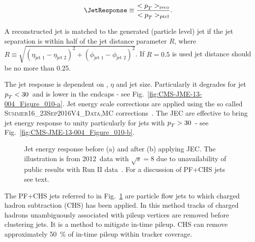\begin{description}
\begin{equation}
\JetResponse\equiv\frac{<\pt>_{\text{reco}}}{<\pt>_{\text{ptcl}}}.    
\end{equation}

A reconstructed jet is matched to the generated (particle level) jet if the jet separation is within half of the jet distance parameter $R$, where $R\equiv\sqrt{\left(\eta_{\text{jet\ 1}} - \eta_{\text{jet\ 2}} \right)^{2}+\left(\phi_{\text{jet\ 1}} - \phi_{\text{jet\ 2}}\right)^{2}}$. If $R=0.5$ is used jet distance should be no more than 0.25.

The jet response is dependent on \pt, $\eta$ and jet size. Particularly it degrades for jet $p_{T}^{}<30$~\GeV and is lower in the endcaps - see Fig.~\ref{fig:CMS-JME-13-004_Figure_010-a}. Jet energy scale corrections are applied using the so called \textsc{Summer16\_23Sep2016V4\_{Data,MC}} corrections~\cite{twiki:JES}. The JEC are effective to bring jet energy response to unity particularly for jets with $p_{T}^{}>30$~\GeV - see Fig.~\ref{fig:CMS-JME-13-004_Figure_010-b}. 

\begin{figure}[htp]
\centering
  \def\twidth{0.45}
  \centering
  \hfil
\caption{Jet energy response before (a) and after (b) applying JEC. The illustration is from 2012~\TeV data with $\sqrt{s}=8$ due to unavailability of public results with Run II data~\cite{Khachatryan:2016kdb}. For a discussion of PF+CHS jets see text.}
\label{fig:CMS-JME-13-004_Figure_010}
\end{figure}

The PF+CHS jets referred to in Fig.~\ref{fig:CMS-JME-13-004_Figure_010} are particle flow jets to which charged hadron subtraction (CHS) has been applied. In this method tracks of charged hadrons unambiguously associated with pileup vertices are removed before clustering jets. It is a method to mitigate in-time pileup. CHS can remove approximately 50~\% of in-time pileup within tracker coverage.


\end{description}
